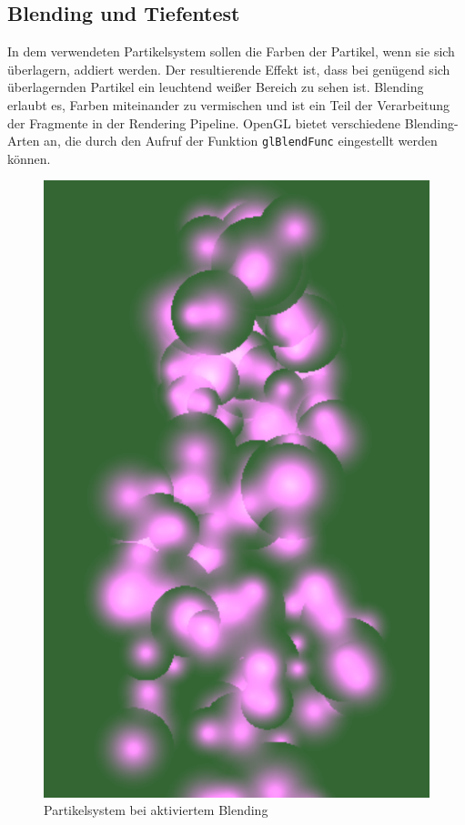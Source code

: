\subsection{Blending und Tiefentest}
\label{Kapitel_2_-_Unterkapitel_2.3}
%
In dem verwendeten Partikelsystem sollen die Farben der Partikel, wenn sie sich überlagern, addiert werden. Der resultierende Effekt ist, dass bei genügend sich überlagernden Partikel ein leuchtend weißer Bereich zu sehen ist. Blending erlaubt es, Farben miteinander zu vermischen und ist ein Teil der Verarbeitung der Fragmente in der Rendering Pipeline. OpenGL bietet verschiedene Blending-Arten an, die durch den Aufruf der Funktion {\texttt{glBlendFunc}} eingestellt werden können. 

\begin{figure}[h]
\centering
\includegraphics[scale=0.4]{bilder/BlendingEnabled}
\caption{Partikelsystem bei aktiviertem Blending}
\label{fig:BlendingEnabled}
\end{figure}

